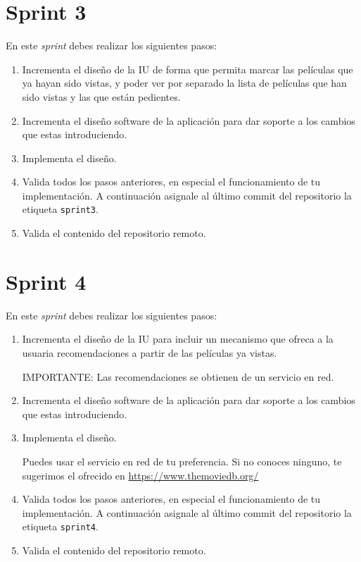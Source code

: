 \documentclass[11pt,a4paper]{article}
\begin{document}
\section{Sprint 3}

En este \emph{sprint} debes realizar los siguientes pasos:

\begin{enumerate}
\item Incrementa el diseño de la IU de forma que permita marcar las
  películas que ya hayan sido vistas, y poder ver por separado la
  lista de películas que han sido vistas y las que están pedientes.

\item Incrementa el diseño software de la aplicación para dar soporte
  a los cambios que estas introduciendo.

\item Implementa el diseño.

\item Valida todos los pasos anteriores, en especial el funcionamiento
  de tu implementación. A continuación asignale al último commit del
  repositorio la etiqueta \texttt{sprint3}.

\item Valida el contenido del repositorio remoto.
\end{enumerate}



\section{Sprint 4}


En este \emph{sprint} debes realizar los siguientes pasos:

\begin{enumerate}
\item Incrementa el diseño de la IU para incluir un mecanismo que
  ofreca a la usuaria recomendaciones a partir de las películas ya
  vistas.

  IMPORTANTE: Las recomendaciones se obtienen de un servicio en red.

\item Incrementa el diseño software de la aplicación para dar soporte
  a los cambios que estas introduciendo.

\item Implementa el diseño.

  Puedes usar el servicio en red de tu preferencia. Si no conoces ninguno,
  te sugerimos el ofrecido en \url{https://www.themoviedb.org/}

\item Valida todos los pasos anteriores, en especial el funcionamiento
  de tu implementación. A continuación asignale al último commit del
  repositorio la etiqueta \texttt{sprint4}.

\item Valida el contenido del repositorio remoto.
\end{enumerate}
\end{document}
